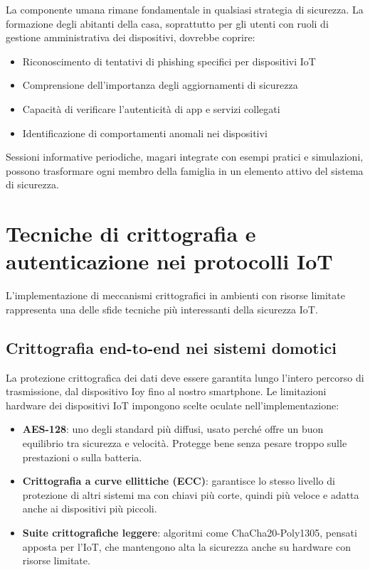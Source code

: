 La componente umana rimane fondamentale in qualsiasi strategia di sicurezza. La formazione degli abitanti della casa, soprattutto per gli utenti con ruoli di gestione amministrativa dei dispositivi,  dovrebbe coprire:

\begin{itemize}
    \item Riconoscimento di tentativi di phishing specifici per dispositivi IoT
    \item Comprensione dell'importanza degli aggiornamenti di sicurezza
    \item Capacità di verificare l'autenticità di app e servizi collegati
    \item Identificazione di comportamenti anomali nei dispositivi
\end{itemize}

Sessioni informative periodiche, magari integrate con esempi pratici e simulazioni, possono trasformare ogni membro della famiglia in un elemento attivo del sistema di sicurezza.

\section{Tecniche di crittografia e autenticazione nei protocolli IoT}

L'implementazione di meccanismi crittografici in ambienti con risorse limitate rappresenta una delle sfide tecniche più interessanti della sicurezza IoT.

\subsection{Crittografia end-to-end nei sistemi domotici}

La protezione crittografica dei dati deve essere garantita lungo l'intero percorso di trasmissione, dal dispositivo Ioy fino al nostro smartphone. Le limitazioni hardware dei dispositivi IoT impongono scelte oculate nell'implementazione:

\begin{itemize}
    \item \textbf{AES-128}: uno degli standard più diffusi, usato perché offre un buon equilibrio tra sicurezza e velocità. Protegge bene senza pesare troppo sulle prestazioni o sulla batteria.
    \item \textbf{Crittografia a curve ellittiche (ECC)}: garantisce lo stesso livello di protezione di altri sistemi ma con chiavi più corte, quindi più veloce e adatta anche ai dispositivi più piccoli.
    \item \textbf{Suite crittografiche leggere}: algoritmi come ChaCha20-Poly1305, pensati apposta per l’IoT, che mantengono alta la sicurezza anche su hardware con risorse limitate.
\end{itemize}
